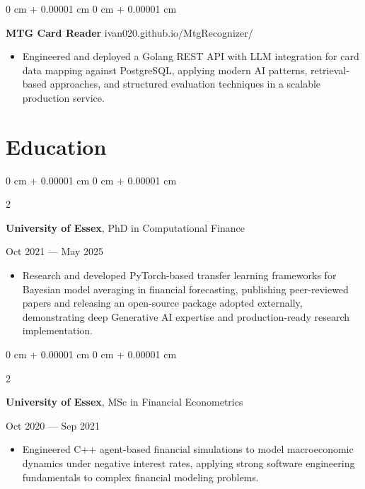 \documentclass[6pt, letterpaper]{article}
\newenvironment{highlights}{
    \begin{itemize}[
        topsep=0.03 cm,
        parsep=0.03 cm,
        partopsep=0pt,
        itemsep=0pt,
        leftmargin=0 cm + 10pt
    ]
}{
    \end{itemize}
} %
\newenvironment{onecolentry}{
    \begin{adjustwidth}{
        0 cm + 0.00001 cm
    }{
        0 cm + 0.00001 cm
    }
}{
    \end{adjustwidth}
} %
\newenvironment{twocolentry}[2][]{
    \onecolentry
    \def\secondColumn{#2}
    \setcolumnwidth{\fill, 4.5 cm}
    \begin{paracol}{2}
}{
    \switchcolumn \raggedleft \secondColumn
    \end{paracol}
    \endonecolentry
} %
\begin{document}
    \begin{onecolentry}
        \textbf{MTG Card Reader} \hfill ivan020.github.io/MtgRecognizer/

        \begin{highlights}
            \item Engineered and deployed a Golang REST API with LLM integration for card data mapping against PostgreSQL, applying modern AI patterns, retrieval-based approaches, and structured evaluation techniques in a scalable production service.

        \end{highlights}
    \end{onecolentry}



    \section{Education}

            \begin{twocolentry}{
                Oct 2021 --- May 2025
            }
            \textbf{University of Essex}, PhD in Computational Finance
            \end{twocolentry}

            \begin{highlights}
            \item Research and developed PyTorch-based transfer learning frameworks for Bayesian model averaging in financial forecasting, publishing peer-reviewed papers and releasing an open-source package adopted externally, demonstrating deep Generative AI expertise and production-ready research implementation.
            \end{highlights}

            \begin{twocolentry}{
                Oct 2020 --- Sep 2021
            }
            \textbf{University of Essex}, MSc in Financial Econometrics
            \end{twocolentry}

            \begin{highlights}
            \item Engineered C++ agent-based financial simulations to model macroeconomic dynamics under negative interest rates, applying strong software engineering fundamentals to complex financial modeling problems.
            \end{highlights}
\end{document}
